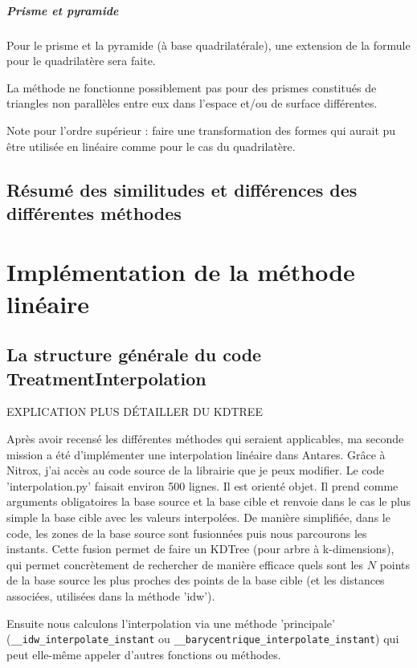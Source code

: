\subparagraph{Prisme et pyramide}

Pour le prisme et la pyramide (à base quadrilatérale), une extension de la formule pour le quadrilatère sera faite.


La méthode ne fonctionne possiblement pas pour des prismes constitués de triangles non parallèles entre eux dans l'espace et/ou de surface différentes.


Note pour l'ordre supérieur : faire une transformation des formes qui aurait pu être utilisée en linéaire comme pour le cas du quadrilatère.



\subsection{Résumé des similitudes et différences des différentes méthodes}



\section{Implémentation de la méthode linéaire}

\subsection{La structure générale du code TreatmentInterpolation}

EXPLICATION PLUS DÉTAILLER DU KDTREE

Après avoir recensé les différentes méthodes qui seraient applicables, ma seconde mission a été d'implémenter une interpolation linéaire dans Antares. Grâce à Nitrox, j'ai accès au code source de la librairie que je peux modifier. Le code 'interpolation.py' faisait environ 500 lignes. Il est orienté objet. Il prend comme arguments obligatoires la base source et la base cible et renvoie dans le cas le plus simple la base cible avec les valeurs interpolées.
De manière simplifiée, dans le code, les zones de la base source sont fusionnées puis nous parcourons les instants. 
Cette fusion permet de faire un KDTree (pour arbre à k-dimensions), qui permet concrètement de rechercher de manière efficace quels sont les \( N \) points de la base source les plus proches des points de la base cible (et les distances associées, utilisées dans la méthode 'idw').

Ensuite nous calculons l'interpolation via une méthode 'principale' (\lstinline{__idw_interpolate_instant} ou
\lstinline{__barycentrique_interpolate_instant}) qui peut elle-même appeler d'autres fonctions ou méthodes.

